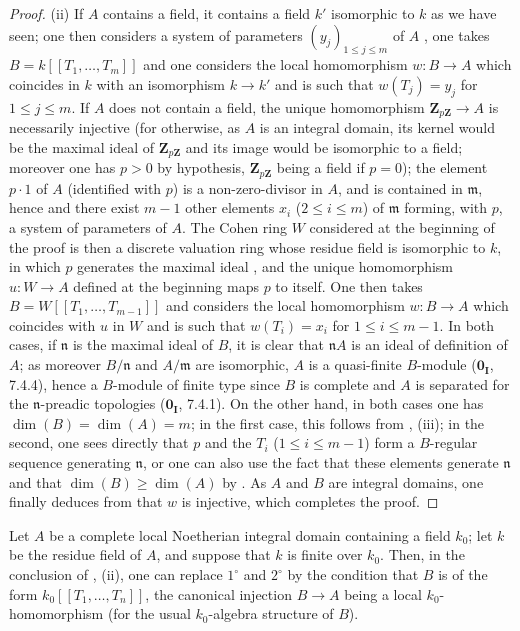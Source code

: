 \begin{proof}
\medskip
\noindent(ii)\enspace
If $A$ contains a field, it contains a field $k'$ isomorphic to $k$ as we have seen; one then considers a system of parameters $(y_j)_{1\leq j\leq m}$ of $A$ , one takes $B=k[[T_1,\ldots,T_m]]$ and one considers the local homomorphism $w:B\to A$ which coincides in $k$ with an isomorphism $k\to k'$ and is such that $w(T_j)=y_j$ for $1\leq j\leq m$.
If $A$ does not contain a field, the unique homomorphism $\mathbf{Z}_{p\mathbf{Z}}\to A$  is necessarily injective (for otherwise, as $A$ is an integral domain, its kernel would be the maximal ideal of $\mathbf{Z}_{p\mathbf{Z}}$ and its image would be isomorphic to a field; moreover one has $p>0$ by hypothesis, $\mathbf{Z}_{p\mathbf{Z}}$ being a field if $p=0$); the element $p\cdot 1$ of $A$ (identified with $p$) is a non-zero-divisor in $A$, and is contained in $\mathfrak{m}$, hence  and  there exist $m-1$ other elements $x_i$ ($2\leq i\leq m$) of $\mathfrak{m}$ forming, with $p$, a system of parameters of $A$.
The Cohen ring $W$ considered at the beginning of the proof is then a discrete valuation ring whose residue field is isomorphic to $k$, in which $p$ generates the maximal ideal , and the unique homomorphism $u:W\to A$ defined at the beginning maps $p$ to itself.
One then takes $B=W[[T_1,\ldots,T_{m-1}]]$ and considers the local homomorphism $w:B\to A$ which coincides with $u$ in $W$ and is such that $w(T_i)=x_i$ for $1\leq i\leq m-1$.
In both cases, if $\mathfrak{n}$ is the maximal ideal of $B$, it is clear that $\mathfrak{n}A$ is an ideal of definition of $A$; as moreover $B/\mathfrak{n}$ and $A/\mathfrak{m}$ are isomorphic, $A$ is a quasi-finite $B$-module ($\mathbf{0_I}$, 7.4.4), hence a $B$-module of finite type since $B$ is complete and $A$ is separated for the $\mathfrak{n}$-preadic topologies ($\mathbf{0_I}$, 7.4.1).
On the other hand, in both cases one has $\dim(B)=\dim(A)=m$; in the first case, this follows from , (iii); in the second, one sees directly that $p$ and the $T_i$ ($1\leq i\leq m-1$) form a $B$-regular sequence generating $\mathfrak{n}$, or one can also use the fact that these elements generate $\mathfrak{n}$ and that $\dim(B)\geq\dim(A)$ by .
As $A$ and $B$ are integral domains, one finally deduces from  that $w$ is injective, which completes the proof.
\end{proof}

\begin{corollary}[19.8.9]
\label{0.19.8.9}
Let $A$ be a complete local Noetherian integral domain containing a field $k_0$; let $k$ be the residue field of $A$, and suppose that $k$ is finite over $k_0$.
Then, in the conclusion of , (ii), one can replace $1^\circ$ and $2^\circ$ by the condition that $B$ is of the form $k_0[[T_1,\ldots,T_n]]$, the canonical injection $B\to A$ being a local $k_0$-homomorphism (for the usual $k_0$-algebra structure of $B$).
\end{corollary}

